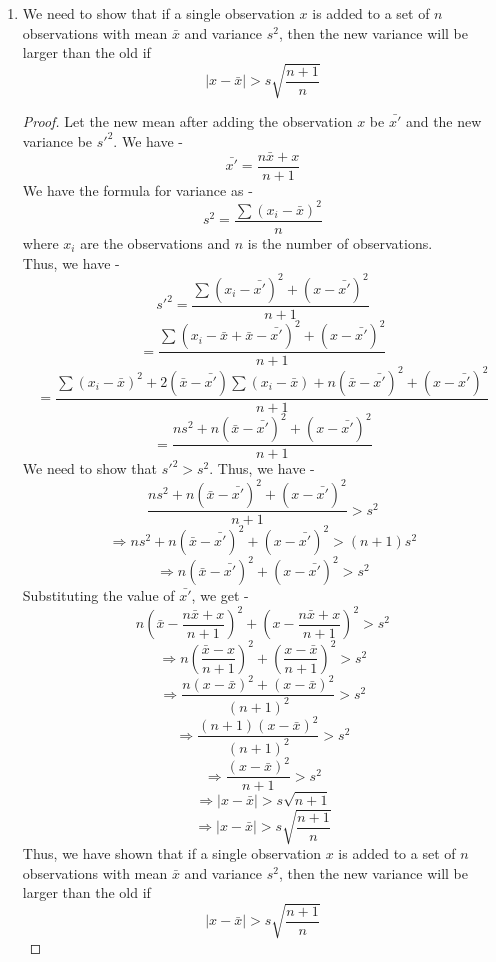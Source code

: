 \begin{enumerate}
    \[\boxed{\sigma_c \approx 5.66
    }\]
    \item We need to show that if a single observation $x$ is added to a set of $n$ observations with mean $\bar{x}$ and variance $s^2$, then the new variance will be larger than the old if $$|x - \bar{x}| > s \sqrt{\frac{n+1}{n}}$$
    \begin{proof}
    Let the new mean after adding the observation $x$ be $\bar{x'}$ and the new variance be $s'^2$. We have -
    \[\bar{x'} = \frac{n \bar{x} + x}{n + 1}\]
    We have the formula for variance as -
    \[s^2 = \frac{\sum (x_i - \bar{x})^2}{n}\]
    where $x_i$ are the observations and $n$ is the number of observations. \\
    Thus, we have -
    \[s'^2 = \frac{\sum (x_i - \bar{x'})^2 + (x - \bar{x'})^2}{n + 1}\]
    \[= \frac{\sum (x_i - \bar{x} + \bar{x} - \bar{x'})^2 + (x - \bar{x'})^2}{n + 1}\]
    \[= \frac{\sum (x_i - \bar{x})^2 + 2(\bar{x} - \bar{x'}) \sum (x_i - \bar{x}) + n(\bar{x} - \bar{x'})^2 + (x - \bar{x'})^2}{n + 1}\]
    \[= \frac{n s^2 + n(\bar{x} - \bar{x'})^2 + (x - \bar{x'})^2}{n + 1}\]
    We need to show that $s'^2 > s^2$. Thus, we have -
    \[\frac{n s^2 + n(\bar{x} - \bar{x'})^2 + (x - \bar{x'})^2}{n + 1} > s^2\]
    \[\Rightarrow n s^2 + n(\bar{x} - \bar{x'})^2 + (x - \bar{x'})^2 > (n + 1) s^2\]
    \[\Rightarrow n(\bar{x} - \bar{x'})^2 + (x - \bar{x'})^2 > s^2\]
    Substituting the value of $\bar{x'}$, we get -
    \[n\left(\bar{x} - \frac{n \bar{x} + x}{n + 1}\right)^2 + \left(x - \frac{n \bar{x} + x}{n + 1}\right)^2 > s^2\]
    \[\Rightarrow n\left(\frac{\bar{x} - x}{n + 1}\right)^2 + \left(\frac{x - \bar{x}}{n + 1}\right)^2 > s^2\]
    \[\Rightarrow \frac{n (x - \bar{x})^2 + (x - \bar{x})^2}{(n + 1)^2} > s^2\]
    \[\Rightarrow \frac{(n + 1)(x - \bar{x})^2}{(n + 1)^2} > s^2\]
    \[\Rightarrow \frac{(x - \bar{x})^2}{n + 1} > s^2\]
    \[\Rightarrow |x - \bar{x}| > s \sqrt{n + 1}\]
    \[\Rightarrow |x - \bar{x}| > s \sqrt{\frac{n + 1}{n}}\]
    Thus, we have shown that if a single observation $x$ is added to a set of $n$ observations with mean $\bar{x}$ and variance $s^2$, then the new variance will be larger than the old if $$|x - \bar{x}| > s \sqrt{\frac{n+1}{n}}$$
    \end{proof}
\end{enumerate}
